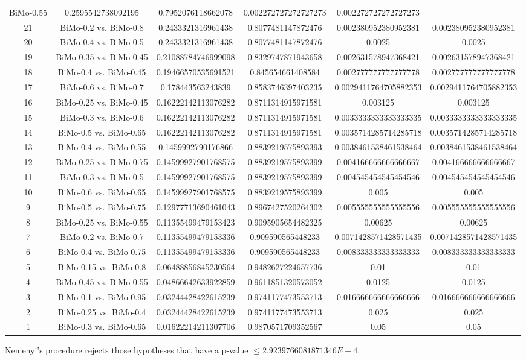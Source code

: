 \documentclass[a4paper,10pt]{article}
\begin{document}
\begin{landscape}
\begin{table}[!htp]
\begin{tabular}{cccccc}
BiMo-0.55&0.2595542738092195&0.7952076118662078&0.002272727272727273&0.002272727272727273\\21&BiMo-0.2 vs. BiMo-0.8&0.2433321316961438&0.8077481147872476&0.002380952380952381&0.002380952380952381\\20&BiMo-0.4 vs. BiMo-0.5&0.2433321316961438&0.8077481147872476&0.0025&0.0025\\19&BiMo-0.35 vs. BiMo-0.45&0.21088784746999098&0.8329747871943658&0.002631578947368421&0.002631578947368421\\18&BiMo-0.4 vs. BiMo-0.45&0.19466570535691521&0.845654661408584&0.002777777777777778&0.002777777777777778\\17&BiMo-0.6 vs. BiMo-0.7&0.178443563243839&0.8583746397403235&0.0029411764705882353&0.0029411764705882353\\16&BiMo-0.25 vs. BiMo-0.45&0.16222142113076282&0.8711314915971581&0.003125&0.003125\\15&BiMo-0.3 vs. BiMo-0.6&0.16222142113076282&0.8711314915971581&0.0033333333333333335&0.0033333333333333335\\14&BiMo-0.5 vs. BiMo-0.65&0.16222142113076282&0.8711314915971581&0.0035714285714285718&0.0035714285714285718\\13&BiMo-0.4 vs. BiMo-0.55&0.1459992790176866&0.8839219575893393&0.0038461538461538464&0.0038461538461538464\\12&BiMo-0.25 vs. BiMo-0.75&0.14599927901768575&0.8839219575893399&0.004166666666666667&0.004166666666666667\\11&BiMo-0.3 vs. BiMo-0.5&0.14599927901768575&0.8839219575893399&0.004545454545454546&0.004545454545454546\\10&BiMo-0.6 vs. BiMo-0.65&0.14599927901768575&0.8839219575893399&0.005&0.005\\9&BiMo-0.5 vs. BiMo-0.75&0.12977713690461043&0.8967427520264302&0.005555555555555556&0.005555555555555556\\8&BiMo-0.25 vs. BiMo-0.55&0.11355499479153423&0.9095905654482325&0.00625&0.00625\\7&BiMo-0.2 vs. BiMo-0.7&0.11355499479153336&0.909590565448233&0.0071428571428571435&0.0071428571428571435\\6&BiMo-0.4 vs. BiMo-0.75&0.11355499479153336&0.909590565448233&0.008333333333333333&0.008333333333333333\\5&BiMo-0.15 vs. BiMo-0.8&0.06488856845230564&0.9482627224657736&0.01&0.01\\4&BiMo-0.45 vs. BiMo-0.55&0.04866642633922859&0.9611851320573052&0.0125&0.0125\\3&BiMo-0.1 vs. BiMo-0.95&0.03244428422615239&0.9741177473553713&0.016666666666666666&0.016666666666666666\\2&BiMo-0.25 vs. BiMo-0.4&0.03244428422615239&0.9741177473553713&0.025&0.025\\1&BiMo-0.3 vs. BiMo-0.65&0.01622214211307706&0.9870571709352567&0.05&0.05\\\hline
\end{tabular}
\end{table}
Nemenyi's procedure rejects those hypotheses that have a p-value $\le2.9239766081871346E-4$.



\end{landscape}
\end{document}
